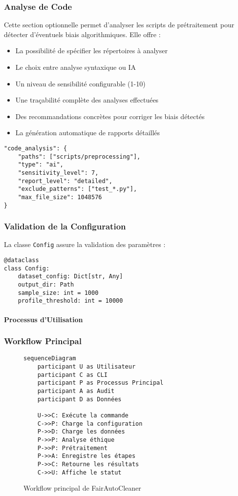 \subsubsection{Analyse de Code}
Cette section optionnelle permet d'analyser les scripts de prétraitement pour détecter d'éventuels biais algorithmiques. Elle offre :
\begin{itemize}
    \item La possibilité de spécifier les répertoires à analyser
    \item Le choix entre analyse syntaxique ou IA
    \item Un niveau de sensibilité configurable (1-10)
    \item Une traçabilité complète des analyses effectuées
    \item Des recommandations concrètes pour corriger les biais détectés
    \item La génération automatique de rapports détaillés
\end{itemize}

\begin{verbatim}
"code_analysis": {
    "paths": ["scripts/preprocessing"],
    "type": "ai",
    "sensitivity_level": 7,
    "report_level": "detailed",
    "exclude_patterns": ["test_*.py"],
    "max_file_size": 1048576
}
\end{verbatim}

\subsubsection{Validation de la Configuration}
La classe \texttt{Config} assure la validation des paramètres :
\begin{verbatim}
@dataclass
class Config:
    dataset_config: Dict[str, Any]
    output_dir: Path
    sample_size: int = 1000
    profile_threshold: int = 10000
\end{verbatim}

\paragraph*{Processus d'Utilisation}

\subsubsection{Workflow Principal}
\begin{figure}[h]
\centering
\begin{verbatim}
sequenceDiagram
    participant U as Utilisateur
    participant C as CLI
    participant P as Processus Principal
    participant A as Audit
    participant D as Données
    
    U->>C: Exécute la commande
    C->>P: Charge la configuration
    P->>D: Charge les données
    P->>P: Analyse éthique
    P->>P: Prétraitement
    P->>A: Enregistre les étapes
    P->>C: Retourne les résultats
    C->>U: Affiche le statut
\end{verbatim}
\caption{Workflow principal de FairAutoCleaner}
\end{figure}

